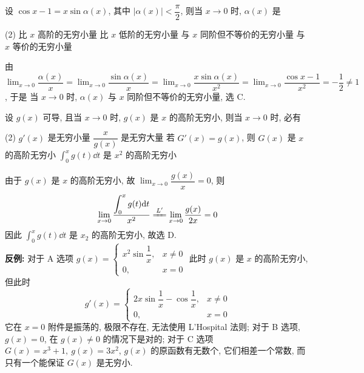 \begin{example}
    设 $\cos x-1=x\sin\alpha(x)$, 其中 $|\alpha(x)|<\dfrac{\pi}{2}$, 则当 $x\to0$ 时, $\alpha(x)$ 是
    \begin{tasks}(2)
        \task 比 $x$ 高阶的无穷小量
        \task 比 $x$ 低阶的无穷小量
        \task 与 $x$ 同阶但不等价的无穷小量
        \task 与 $x$ 等价的无穷小量
    \end{tasks}
\end{example}
\begin{solution}
    由 $\displaystyle \lim_{x\to0}\dfrac{\alpha(x)}{x}=\lim_{x\to0}\dfrac{\sin\alpha(x)}{x}=\lim_{x\to0}\dfrac{x\sin\alpha(x)}{x^2}=\lim_{x\to0}\dfrac{\cos x-1}{x^2}=-\dfrac{1}{2}\neq1$, 于是
    当 $x\to0$ 时, $\alpha(x)$ 与 $x$ 同阶但不等价的无穷小量, 选 C.
\end{solution}

\begin{example}
    设 $g(x)$ 可导, 且当 $x\to0$ 时,  $g(x)$ 是 $x$ 的高阶无穷小, 则当 $x\to0$  时, 必有
    \begin{tasks}(2)
        \task $g'(x)$ 是无穷小量
        \task $\dfrac{x}{g(x)}$ 是无穷大量
        \task 若 $G'(x)=g(x)$, 则 $G(x)$ 是 $x$ 的高阶无穷小
        \task $\displaystyle\int_{0}^{x}g(t)\dd t$ 是 $x^2$ 的高阶无穷小
    \end{tasks}
\end{example}
\begin{solution}
    由于 $g(x)$ 是 $x$ 的高阶无穷小, 故 $\displaystyle\lim_{x\to0}\dfrac{g(x)}{x}=0$, 则 $$\displaystyle\lim_{x\to0}\dfrac{\displaystyle\int_{0}^{x}g(t)\dd t}{x^2} \xlongequal{L'}\lim_{x\to0}\dfrac{g(x)}{2x}=0$$
    因此 $\displaystyle\int_{0}^{x}g(t)\dd t$ 是 $x_2$ 的高阶无穷小, 故选 D.\\
    \textbf{反例: }对于 A 选项 $g(x)=\begin{cases}
            x^2\sin\dfrac{1}{x}, & x\neq0 \\
            0,                   & x=0
        \end{cases}$ 此时 $g(x)$ 是 $x$ 的高阶无穷小, 但此时 $$g'(x)=\begin{cases}
            2x\sin\dfrac{1}{x}-\cos\dfrac{1}{x}, & x\neq0 \\
            0,                                   & x=0
        \end{cases}$$
    它在 $x=0$ 附件是振荡的, 极限不存在, 无法使用 L'Hospital 法则; 对于 B 选项, $g(x)=0$, 在 $g(x)\neq0$ 的情况下是对的; 对于 C 选项 $G(x)=x^3+1,~g(x)=3x^2$, $g(x)$ 的原函数有无数个, 它们相差一个常数, 而只有一个能保证 $G(x)$ 是无穷小.
\end{solution}

